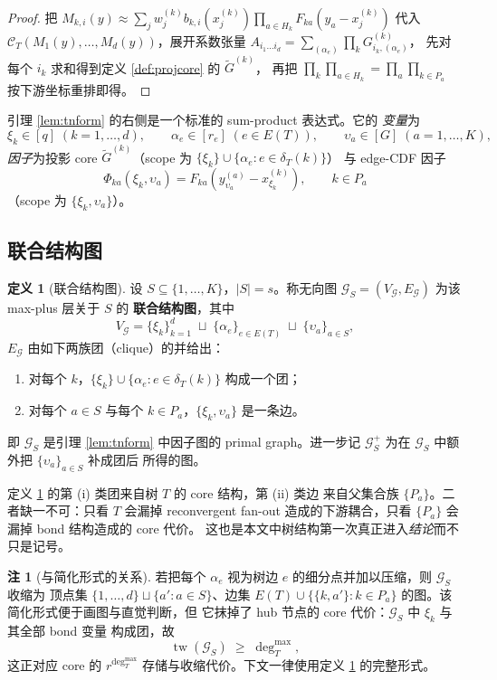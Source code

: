 \documentclass[a4paper,11pt]{article}
\theoremstyle{definition}
\newtheorem{definition}{定义}
\newtheorem{remark}{注}
\newcommand{\1}{\mathbf 1}
\newcommand{\tw}{\operatorname{tw}}
\newcommand{\Gcal}{\mathcal G}
\begin{document}
\begin{proof}
把 $M_{k,i}(y)\approx\sum_{j}w^{(k)}_j b_{k,i}(x^{(k)}_j)
\prod_{a\in H_k}F_{ka}(y_a-x^{(k)}_j)$ 代入
$\mathcal C_T(M_1(y),\ldots,M_d(y))$，展开系数张量
$A_{i_1\ldots i_d}=\sum_{(\alpha_e)}\prod_k G^{(k)}_{i_k,(\alpha_e)}$，
先对每个 $i_k$ 求和得到定义 \ref{def:projcore} 的 $\widetilde G^{(k)}$，
再把 $\prod_k\prod_{a\in H_k}=\prod_a\prod_{k\in P_a}$ 按下游坐标重排即得。
\end{proof}

引理 \ref{lem:tnform} 的右侧是一个标准的 sum-product 表达式。它的
\emph{变量}为
\[
\xi_k\in[q]\;(k=1,\ldots,d),
\qquad
\alpha_e\in[r_e]\;(e\in E(T)),
\qquad
\upsilon_a\in[G]\;(a=1,\ldots,K),
\]
\emph{因子}为投影 core
$\widetilde G^{(k)}$（scope 为 $\{\xi_k\}\cup\{\alpha_e:e\in\delta_T(k)\}$）
与 edge-CDF 因子
\[
\Phi_{ka}(\xi_k,\upsilon_a)
=
F_{ka}\!\left(y^{(a)}_{\upsilon_a}-x^{(k)}_{\xi_k}\right),
\qquad k\in P_a
\]
（scope 为 $\{\xi_k,\upsilon_a\}$）。

\subsection{联合结构图}

\begin{definition}[联合结构图]
\label{def:joint}
设 $S\subseteq\{1,\ldots,K\}$，$|S|=s$。称无向图
$\Gcal_S=(V_{\Gcal},E_{\Gcal})$ 为该 max-plus 层关于 $S$ 的
\textbf{联合结构图}，其中
\[
V_{\Gcal}
=
\{\xi_k\}_{k=1}^{d}
\;\sqcup\;
\{\alpha_e\}_{e\in E(T)}
\;\sqcup\;
\{\upsilon_a\}_{a\in S},
\]
$E_{\Gcal}$ 由如下两族团（clique）的并给出：
\begin{enumerate}[label=(\roman*)]
\item 对每个 $k$，$\{\xi_k\}\cup\{\alpha_e:e\in\delta_T(k)\}$ 构成一个团；
\item 对每个 $a\in S$ 与每个 $k\in P_a$，$\{\xi_k,\upsilon_a\}$ 是一条边。
\end{enumerate}
即 $\Gcal_S$ 是引理 \ref{lem:tnform} 中因子图的 primal graph。进一步记
$\Gcal_S^{+}$ 为在 $\Gcal_S$ 中额外把 $\{\upsilon_a\}_{a\in S}$ 补成团后
所得的图。
\end{definition}

定义 \ref{def:joint} 的第 (i) 类团来自树 $T$ 的 core 结构，第 (ii) 类边
来自父集合族 $\{P_a\}$。二者缺一不可：只看 $T$ 会漏掉 reconvergent
fan-out 造成的下游耦合，只看 $\{P_a\}$ 会漏掉 bond 结构造成的 core 代价。
这也是本文中树结构第一次真正进入\emph{结论}而不只是记号。

\begin{remark}[与简化形式的关系]
\label{rem:reducedgraph}
若把每个 $\alpha_e$ 视为树边 $e$ 的细分点并加以压缩，则 $\Gcal_S$ 收缩为
顶点集 $\{1,\ldots,d\}\sqcup\{a':a\in S\}$、边集
$E(T)\cup\{\{k,a'\}:k\in P_a\}$ 的图。该简化形式便于画图与直觉判断，但
它抹掉了 hub 节点的 core 代价：$\Gcal_S$ 中 $\xi_k$ 与其全部 bond 变量
构成团，故
\[
\tw(\Gcal_S)\;\ge\;\deg_T^{\max},
\]
这正对应 core 的 $r^{\deg_T^{\max}}$ 存储与收缩代价。下文一律使用定义
\ref{def:joint} 的完整形式。
\end{remark}
\end{document}

